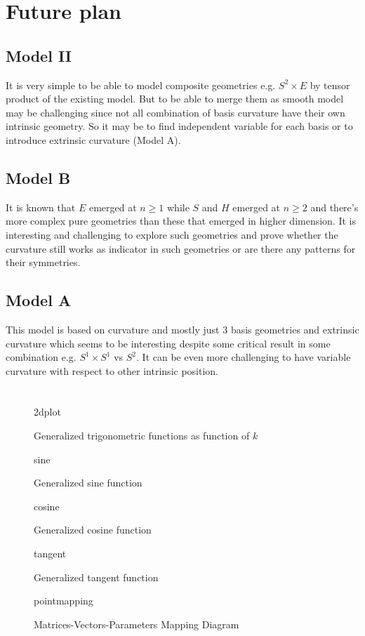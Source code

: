 \documentclass[stu, babel, american, biblatex, a4paper, leqno, draftall]{apa7}
\newcommand{\insertstandalone}[2]{{#2}}
\newcommand{\insertstandalone}[2]{\texttt{[image: \#1/\#2.pdf]}}
\begin{document}
\section{Future plan}
\subsection{Model II}
It is very simple to be able to model composite geometries e.g. $S^2 \times E$ by tensor product of the existing model. But to be able to merge them as smooth model may be challenging since not all combination of basis curvature have their own intrinsic geometry. So it may be to find independent variable for each basis or to introduce extrinsic curvature (Model A).
\subsection{Model B}
It is known that $E$ emerged at $n\ge1$ while $S$ and $H$ emerged at $n\ge2$ and there's more complex pure geometries than these that emerged in higher dimension. It is interesting and challenging to explore such geometries and prove whether the curvature still works as indicator in such geometries or are there any patterns for their symmetries.
\subsection{Model A}
This model is based on curvature and mostly just 3 basis geometries and extrinsic curvature which seems to be interesting despite some critical result in some combination e.g. $S^1 \times S^1$ vs $S^2$. It can be even more challenging to have variable curvature with respect to other intrinsic position.
\section*{}
\printbibliography
\begin{figure}
    \centering
    \insertstandalone{figures}{2dplot}
    \caption{Generalized trigonometric functions as function of $k$}\label{TrigonometryPlotted}
\end{figure}
\begin{figure}
    \centering
    \insertstandalone{figures}{sine}
    \caption{Generalized sine function}\label{TrigonometrySinePlotted}
\end{figure}
\begin{figure}
    \centering
    \insertstandalone{figures}{cosine}
    \caption{Generalized cosine function}\label{TrigonometryCosinePlotted}
\end{figure}
\begin{figure}
    \centering
    \insertstandalone{figures}{tangent}
    \caption{Generalized tangent function}\label{TrigonometryTangentPlotted}
\end{figure}
\begin{figure}
    \centering
    \insertstandalone{figures}{pointmapping}
    \caption{Matrices-Vectors-Parameters Mapping Diagram}\label{PointMappingDiagram}
\end{figure}
\end{document}
